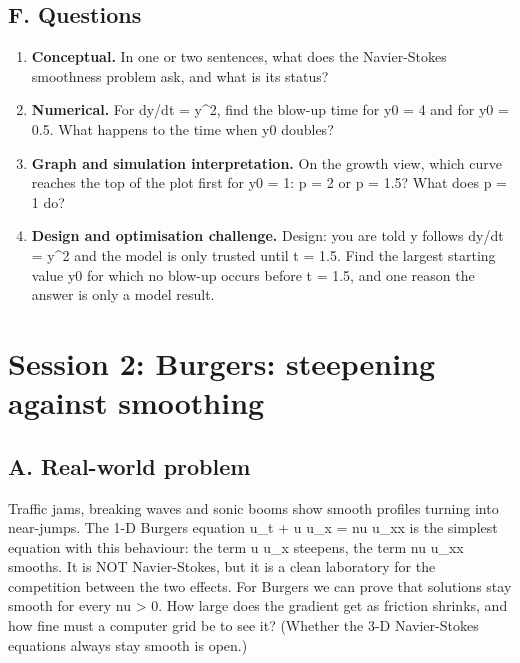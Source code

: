 \documentclass[11pt,a4paper]{article}
\begin{document}
\subsection*{F. Questions}
\begin{enumerate}[nosep]
\item \textbf{Conceptual.} In one or two sentences, what does the Navier-Stokes smoothness problem ask, and what is its status?
\item \textbf{Numerical.} For dy/dt = y\textasciicircum{}2, find the blow-up time for y0 = 4 and for y0 = 0.5. What happens to the time when y0 doubles?
\item \textbf{Graph and simulation interpretation.} On the growth view, which curve reaches the top of the plot first for y0 = 1: p = 2 or p = 1.5? What does p = 1 do?
\item \textbf{Design and optimisation challenge.} Design: you are told y follows dy/dt = y\textasciicircum{}2 and the model is only trusted until t = 1.5. Find the largest starting value y0 for which no blow-up occurs before t = 1.5, and one reason the answer is only a model result.
\end{enumerate}

\section{Session 2: Burgers: steepening against smoothing}

\subsection*{A. Real-world problem}
Traffic jams, breaking waves and sonic booms show smooth profiles turning into near-jumps. The 1-D Burgers equation u\_t + u u\_x = nu u\_xx is the simplest equation with this behaviour: the term u u\_x steepens, the term nu u\_xx smooths. It is NOT Navier-Stokes, but it is a clean laboratory for the competition between the two effects. For Burgers we can prove that solutions stay smooth for every nu \textgreater{} 0. How large does the gradient get as friction shrinks, and how fine must a computer grid be to see it? (Whether the 3-D Navier-Stokes equations always stay smooth is open.)
\end{document}

